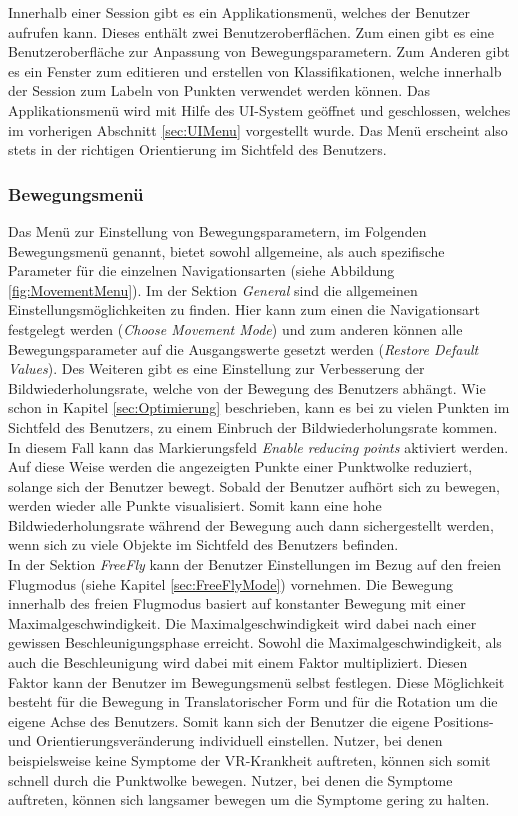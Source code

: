 Innerhalb einer Session gibt es ein Applikationsmenü, welches der Benutzer aufrufen kann. Dieses enthält zwei Benutzeroberflächen. Zum einen gibt es eine Benutzeroberfläche zur Anpassung von Bewegungsparametern. Zum Anderen gibt es ein Fenster zum editieren und erstellen von Klassifikationen, welche innerhalb der Session zum Labeln von Punkten verwendet werden können. Das Applikationsmenü wird mit Hilfe des UI-System geöffnet und geschlossen, welches im vorherigen Abschnitt \ref{sec:UIMenu} vorgestellt wurde. Das Menü erscheint also stets in der richtigen Orientierung im Sichtfeld des Benutzers.\\

\subsubsection{Bewegungsmenü}

Das Menü zur Einstellung von Bewegungsparametern, im Folgenden Bewegungsmenü genannt, bietet sowohl allgemeine, als auch spezifische Parameter für die einzelnen Navigationsarten (siehe Abbildung \ref{fig:MovementMenu}). Im der Sektion \textit{General} sind die allgemeinen Einstellungsmöglichkeiten zu finden. Hier kann zum einen die Navigationsart festgelegt werden (\textit{Choose Movement Mode}) und zum anderen können alle Bewegungsparameter auf die Ausgangswerte gesetzt werden (\textit{Restore Default Values}). Des Weiteren gibt es eine  Einstellung zur Verbesserung der Bildwiederholungsrate, welche von der Bewegung des Benutzers abhängt. Wie schon in Kapitel \ref{sec:Optimierung} beschrieben, kann es bei zu vielen Punkten im Sichtfeld des Benutzers, zu einem Einbruch der Bildwiederholungsrate kommen. In diesem Fall kann das Markierungsfeld \textit{Enable reducing points} aktiviert werden. Auf diese Weise werden die angezeigten Punkte einer Punktwolke reduziert, solange sich der Benutzer bewegt. Sobald der Benutzer aufhört sich zu bewegen, werden wieder alle Punkte visualisiert. Somit kann eine hohe Bildwiederholungsrate während der Bewegung auch dann sichergestellt werden, wenn sich zu viele Objekte im Sichtfeld des Benutzers befinden.\\

In der Sektion \textit{FreeFly} kann der Benutzer Einstellungen im Bezug auf den freien Flugmodus (siehe Kapitel \ref{sec:FreeFlyMode}) vornehmen. Die Bewegung innerhalb des freien Flugmodus basiert auf konstanter Bewegung mit einer Maximalgeschwindigkeit. Die Maximalgeschwindigkeit wird dabei nach einer gewissen Beschleunigungsphase erreicht. Sowohl die Maximalgeschwindigkeit, als auch die Beschleunigung wird dabei mit einem Faktor multipliziert. Diesen Faktor kann der Benutzer im Bewegungsmenü selbst festlegen. Diese Möglichkeit besteht für die Bewegung in Translatorischer Form und für die Rotation um die eigene Achse des Benutzers. Somit kann sich der Benutzer die eigene Positions- und Orientierungsveränderung individuell einstellen. Nutzer, bei denen beispielsweise keine Symptome der VR-Krankheit auftreten, können sich somit schnell durch die Punktwolke bewegen. Nutzer, bei denen die Symptome auftreten, können sich langsamer bewegen um die Symptome gering zu halten.\\

